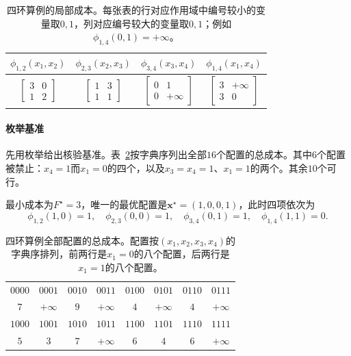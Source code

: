 \begin{table}[!htb]
  \centering
  \begin{tabular}{cccc}
    \toprule
    $\phi_{1,2}(x_1,x_2)$ & $\phi_{2,3}(x_2,x_3)$ & $\phi_{3,4}(x_3,x_4)$ & $\phi_{1,4}(x_1,x_4)$\\
    \midrule
    $\begin{bmatrix}3&0\\1&2\end{bmatrix}$ &
    $\begin{bmatrix}1&3\\1&1\end{bmatrix}$ &
    $\begin{bmatrix}0&1\\0&+\infty\end{bmatrix}$ &
    $\begin{bmatrix}3&+\infty\\3&0\end{bmatrix}$\\
    \bottomrule
  \end{tabular}
  \caption{四环算例的局部成本。每张表的行对应作用域中编号较小的变量取$0,1$，列对应编号较大的变量取$0,1$；例如$\phi_{1,4}(0,1)=+\infty$。}
  \label{tab:graph-dp-four-cycle-costs}
\end{table}

\paragraph{枚举基准}
先用枚举给出核验基准。表~\ref{tab:graph-dp-four-cycle-enumeration}按字典序列出全部$16$个配置的总成本。其中$6$个配置被禁止：$x_4=1$而$x_1=0$的四个，以及$x_3=x_4=1$、$x_1=1$的两个。其余$10$个可行。

最小成本为$F^\star=3$，唯一的最优配置是$\bm x^\star=(1,0,0,1)$，此时四项依次为
\[
\phi_{1,2}(1,0)=1,\quad \phi_{2,3}(0,0)=1,\quad \phi_{3,4}(0,1)=1,\quad \phi_{1,4}(1,1)=0.
\]

\begin{table}[!htb]
  \centering
  \small
  \begin{tabular}{@{}cccccccc@{}}
    \toprule
    $0000$ & $0001$ & $0010$ & $0011$ & $0100$ & $0101$ & $0110$ & $0111$\\
    $7$ & $+\infty$ & $9$ & $+\infty$ & $4$ & $+\infty$ & $4$ & $+\infty$\\
    \midrule
    $1000$ & $1001$ & $1010$ & $1011$ & $1100$ & $1101$ & $1110$ & $1111$\\
    $5$ & $3$ & $7$ & $+\infty$ & $6$ & $4$ & $6$ & $+\infty$\\
    \bottomrule
  \end{tabular}
  \caption{四环算例全部配置的总成本。配置按$(x_1,x_2,x_3,x_4)$的字典序排列，前两行是$x_1=0$的八个配置，后两行是$x_1=1$的八个配置。}
  \label{tab:graph-dp-four-cycle-enumeration}
\end{table}

